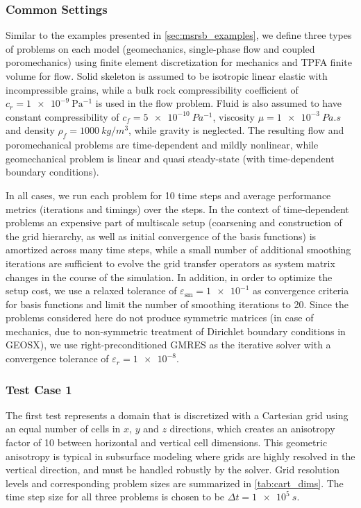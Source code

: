 \subsubsection{Common Settings}

Similar to the examples presented in \cref{sec:msrsb_examples}, we define three types of problems on each model (geomechanics, single-phase flow and coupled poromechanics) using finite element discretization for mechanics and TPFA finite volume for flow.   Solid skeleton is assumed to be isotropic linear elastic with incompressible grains, while a bulk rock compressibility coefficient of $c_r = \qty{1e-9}{\Pa^{-1}}$ is used in the flow problem.   Fluid is also assumed to have constant compressibility of $c_f = \qty{5e-10}{Pa^{-1}}$, viscosity $\mu = \qty{1e-3}{Pa.s}$ and density $\rho_f = \qty{1000}{kg/m^3}$, while gravity is neglected.   The resulting flow and poromechanical problems are time-dependent and mildly nonlinear, while geomechanical problem is linear and quasi steady-state (with time-dependent boundary conditions).

In all cases, we run each problem for 10 time steps and average performance metrics (iterations and timings) over the steps.   In the context of time-dependent problems an expensive part of multiscale setup (coarsening and construction of the grid hierarchy, as well as initial convergence of the basis functions) is amortized across many time steps, while a small number of additional smoothing iterations are sufficient to evolve the grid transfer operators as system matrix changes in the course of the simulation.   In addition, in order to optimize the setup cost, we use a relaxed tolerance of $\varepsilon_{\text{sm}} = \num{1e-1}$ as convergence criteria for basis functions and limit the number of smoothing iterations to 20.   Since the problems considered here do not produce symmetric matrices (in case of mechanics, due to non-symmetric treatment of Dirichlet boundary conditions in GEOSX), we use right-preconditioned GMRES as the iterative solver with a convergence tolerance of $\varepsilon_r = \num{1e-8}$.

\subsubsection{Test Case 1}

The first test represents a  domain that is discretized with a Cartesian grid using an equal number of cells in $x$, $y$ and $z$ directions, which creates an anisotropy factor of 10 between horizontal and vertical cell dimensions.   This geometric anisotropy is typical in subsurface modeling where grids are highly resolved in the vertical direction, and must be handled robustly by the solver.   Grid resolution levels and corresponding problem sizes are summarized in \cref{tab:cart_dims}.   The time step size for all three problems is chosen to be $\Delta t = \qty{1e5}{s}$.


